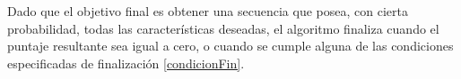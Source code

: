 

Dado que el objetivo final es obtener una secuencia que posea, con cierta probabilidad, todas las características deseadas, 
el algoritmo finaliza cuando el puntaje resultante sea igual a cero, o cuando se cumple alguna de las condiciones especificadas de finalización \ref{condicionFin}. 






